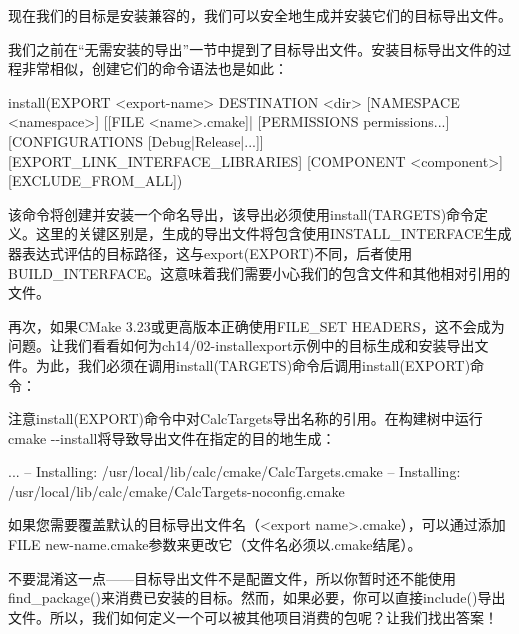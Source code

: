 现在我们的目标是安装兼容的，我们可以安全地生成并安装它们的目标导出文件。


我们之前在“无需安装的导出”一节中提到了目标导出文件。安装目标导出文件的过程非常相似，创建它们的命令语法也是如此：

\begin{cmake}
install(EXPORT <export-name> DESTINATION <dir>
        [NAMESPACE <namespace>] [[FILE <name>.cmake]|
        [PERMISSIONS permissions...]
        [CONFIGURATIONS [Debug|Release|...]]
        [EXPORT_LINK_INTERFACE_LIBRARIES]
        [COMPONENT <component>]
        [EXCLUDE_FROM_ALL])
\end{cmake}

该命令将创建并安装一个命名导出，该导出必须使用install(TARGETS)命令定义。这里的关键区别是，生成的导出文件将包含使用INSTALL\_INTERFACE生成器表达式评估的目标路径，这与export(EXPORT)不同，后者使用BUILD\_INTERFACE。这意味着我们需要小心我们的包含文件和其他相对引用的文件。

再次，如果CMake 3.23或更高版本正确使用FILE\_SET HEADERS，这不会成为问题。让我们看看如何为ch14/02-installexport示例中的目标生成和安装导出文件。为此，我们必须在调用install(TARGETS)命令后调用install(EXPORT)命令：



注意install(EXPORT)命令中对CalcTargets导出名称的引用。在构建树中运行cmake -{}-install将导致导出文件在指定的目的地生成：

\begin{shell}
...
-- Installing: /usr/local/lib/calc/cmake/CalcTargets.cmake
-- Installing: /usr/local/lib/calc/cmake/CalcTargets-noconfig.cmake
\end{shell}

如果您需要覆盖默认的目标导出文件名（<export name>.cmake），可以通过添加FILE new-name.cmake参数来更改它（文件名必须以.cmake结尾）。

不要混淆这一点——目标导出文件不是配置文件，所以你暂时还不能使用find\_package()来消费已安装的目标。然而，如果必要，你可以直接include()导出文件。所以，我们如何定义一个可以被其他项目消费的包呢？让我们找出答案！

